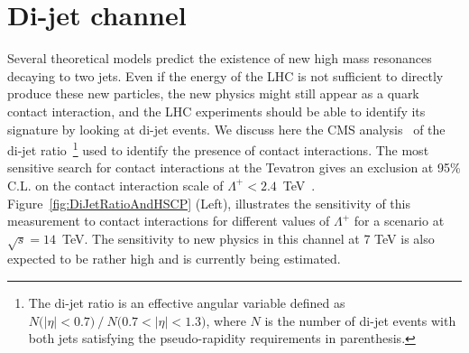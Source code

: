 \documentclass{cmspaper}
\begin{document}
\section{Di-jet channel} \label{dijet}
Several theoretical models predict the existence of new 
high mass resonances decaying to two jets.
Even if the energy of the LHC is not sufficient to directly produce 
these new particles, the new physics might still appear as 
a quark contact interaction,
and the LHC experiments should be able to identify its signature 
by looking at di-jet events.
We discuss here the CMS analysis~\cite{DIJETSNOTE}
of the di-jet ratio~\footnote{
The di-jet ratio is an effective angular variable
defined as $N\mbox{(}|\eta|<0.7\mbox{)}~/~N\mbox{(}0.7<|\eta|< 1.3 \mbox{)}$, 
where $N$ is the number of di-jet events with both jets satisfying the 
pseudo-rapidity requirements in parenthesis.} 
used to identify the presence of contact interactions. 
The most sensitive search for contact interactions at the Tevatron 
gives an exclusion at 95\% C.L. on the contact interaction scale 
of $\Lambda^{+} < 2.4$~TeV~\cite{Abbott:1998wh}.  
Figure~\ref{fig:DiJetRatioAndHSCP} (Left), illustrates the sensitivity of this measurement to 
contact interactions for different values of $\Lambda^{+}$ for a scenario at $\sqrt{s} = 14$~TeV.
The sensitivity to new physics in this channel at 7 TeV is also expected to be rather high and 
is currently being estimated.
\end{document}
